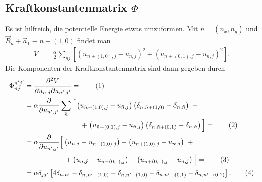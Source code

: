 \documentclass[english, parskip=full]{scrartcl}
\newcommand\numberthis{\addtocounter{equation}{1}\tag{\theequation}}
\newcommand{\kla}{}
\newcommand{\klam}{}
\begin{document}
\subsection{Kraftkonstantenmatrix $\Phi$}
Es ist hilfreich, die potentielle Energie etwas umzuformen.
Mit $n=(n_x,n_y)$ und $\vec{R}_n+\vec{a}_{1} \equiv n + (1,0)$ findet man
\begin{align}
V &= \frac{\alpha}{2}\sum_{nj} \klam\left[ \kla\left( u_{n+(1,0),j} - u_{n,j} \right)^2 + \kla\left( u_{n+(0,1),j} - u_{n,j} \right)^2 \right].
\end{align}
Die Komponenten der Kraftkonstantenmatrix sind dann gegeben durch
\begin{align*}
\Phi_{nj}^{n'j'} &= \frac{\partial^2V}{\partial u_{n,j}\partial u_{n', j'}} = \numberthis \\
&= \alpha\frac{\partial}{\partial u_{n',j'}} \sum_{\tilde{n}} \klam\Big[ \kla\left( u_{\tilde{n} + (1,0), j} - u_{\tilde{n},j} \right) \kla\left( \delta_{n,\tilde{n} + (1,0)} - \delta_{n,\tilde{n}} \right)\ + \\
&\hspace{2.8cm} + \kla\left( u_{\tilde{n} + (0,1),j} - u_{\tilde{n},j} \right) \kla\left( \delta_{n,\tilde{n} + (0,1)} - \delta_{n,\tilde{n}} \right) \Big] = \numberthis \\
&= \alpha\frac{\partial}{\partial u_{n',j'}}  \klam\Big[ \kla\left( u_{n, j} - u_{n - (1,0),j} \right) - \kla\left( u_{n + (1,0),j} - u_{n,j} \right)\ + \\
&\hspace{2cm} + \kla\left( u_{n,j} - u_{n-(0,1),j} \right) - \kla\left( u_{n+(0,1),j} - u_{n,j} \right) \Big] = \numberthis \\
&= \alpha\delta_{jj'} \klam\left[ 4\delta_{n,n'} - \delta_{n,n'+(1,0)} - \delta_{n,n'-(1,0)} - \delta_{n,n'+(0,1)} - \delta_{n,n'-(0,1)} \right]. \numberthis
\end{align*}
\end{document}
